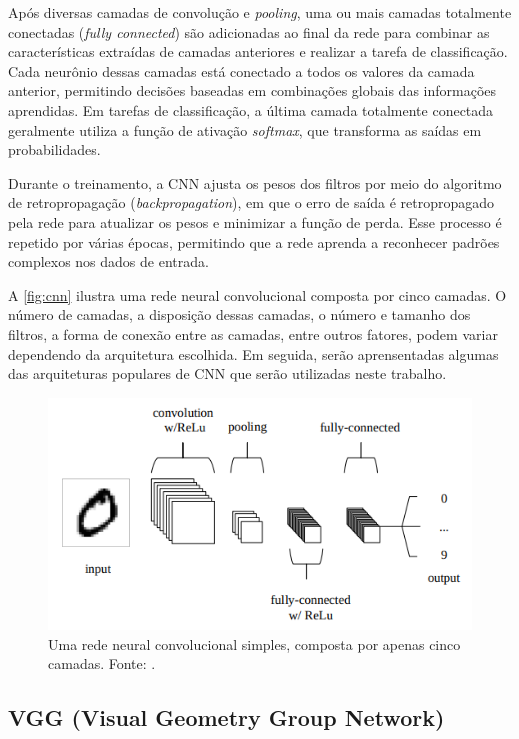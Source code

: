 Após diversas camadas de convolução e \textit{pooling}, uma ou mais camadas totalmente conectadas (\textit{fully connected}) são adicionadas ao final da rede para combinar as características extraídas de camadas anteriores e realizar a tarefa de classificação. Cada neurônio dessas camadas está conectado a todos os valores da camada anterior, permitindo decisões baseadas em combinações globais das informações aprendidas. Em tarefas de classificação, a última camada totalmente conectada geralmente utiliza a função de ativação \textit{softmax}, que transforma as saídas em probabilidades.

Durante o treinamento, a CNN ajusta os pesos dos filtros por meio do algoritmo de retropropagação (\textit{backpropagation}), em que o erro de saída é retropropagado pela rede para atualizar os pesos e minimizar a função de perda. Esse processo é repetido por várias épocas, permitindo que a rede aprenda a reconhecer padrões complexos nos dados de entrada.

A \autoref{fig:cnn} ilustra uma rede neural convolucional composta por cinco camadas. O número de camadas, a disposição dessas camadas, o número e tamanho dos filtros, a forma de conexão entre as camadas, entre outros fatores, podem variar dependendo da arquitetura escolhida. Em seguida, serão aprensentadas algumas das arquiteturas populares de CNN que serão utilizadas neste trabalho.

\begin{figure}[h]
    \centering
    \includegraphics[width=0.7\linewidth]{figs/convolution-neural-network.png}
    \caption{Uma rede neural convolucional simples, composta por apenas cinco camadas. Fonte: \cite{Saxena2022}.}
    \label{fig:cnn}
\end{figure}

\subsection{VGG (Visual Geometry Group Network)}

